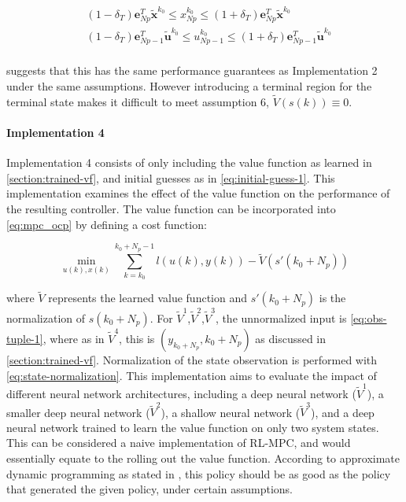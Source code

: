\begin{equation}\label{eq:terminal-region}
	\begin{aligned}
		& (1-\delta_T)\mathbf{e}_{Np}^T \tilde{\mathbf{x}}^{k_0} \leq x^{k_0}_{Np} \leq (1+\delta_T)\mathbf{e}_{Np}^T \tilde{\mathbf{x}}^{k_0}\\
		&(1-\delta_T)\mathbf{e}_{Np-1}^T\tilde{\mathbf{u}}^{k_0} \leq u^{k_0}_{Np-1} \leq (1+\delta_T) \mathbf{e}_{Np-1}^T\tilde{\mathbf{u}}^{k_0}\\
	\end{aligned}
\end{equation}

\cite{amritEconomicOptimizationUsing2011} suggests that this has the same performance guarantees as Implementation 2 under the same assumptions. However introducing a terminal region for the terminal state makes it difficult to meet assumption 6, $\tilde{V}(s(k)) \equiv 0$. 

\paragraph{Implementation 4}
Implementation 4 consists of only including the value function as learned in \autoref{section:trained-vf}, and initial guesses as in \autoref{eq:initial-guess-1}. This implementation examines the effect of the value function on the performance of the resulting controller. The value function can be incorporated into \autoref{eq:mpc_ocp} by defining a cost function:

\begin{equation}\label{eq:cost-function}
		\min_{u(k),x(k)}  \sum_{k = k_0}^{k_0 + N_p - 1}{l(u(k), y(k))} - \tilde{V}(s'(k_0 + N_p))
\end{equation}

where $\tilde{V}$ represents the learned value function and $s'(k_0+N_p)$ is the normalization of $s(k_0+N_p)$. For $\tilde{V}^1$,$\tilde{V}^2$,$\tilde{V}^3$, the unnormalized input is \autoref{eq:obs-tuple-1}, where as in $\tilde{V}^4$, this is $(y_{k_0+N_p},k_0+N_p)$ as discussed in \autoref{section:trained-vf}. Normalization of the state observation is performed with \autoref{eq:state-normalization}. This implementation aims to evaluate the impact of different neural network architectures, including a deep neural network ($\tilde{V}^1$), a smaller deep neural network ($\tilde{V}^2$), a shallow neural network ($\tilde{V}^3$), and a deep neural network trained to learn the value function on only two system states. This can be considered a naive implementation of RL-MPC, and would essentially equate to the rolling out the value function. According to approximate dynamic programming as stated in \cite{bertsekasLessonsAlphaZeroOptimal}, this policy should be as good as the policy that generated the given policy, under certain assumptions. 

